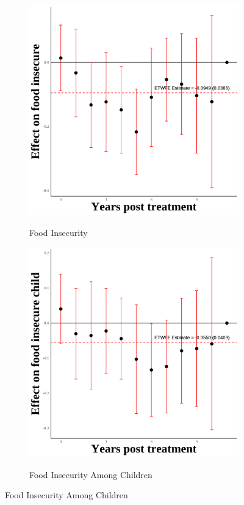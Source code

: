 \documentclass[12pt,english]{article}
\begin{document}
\begin{figure}[H]
  \begin{subfigure}[b]{0.3\textwidth}
    \centering
    \caption{Food Insecurity}
    \includegraphics[width=\linewidth]{figures/plot15-food_insecure_event_study-first.png}
    \label{fig:food-insecure-first}
  \end{subfigure}
  \hfill
  \begin{subfigure}[b]{0.3\textwidth}
    \centering
    \caption{Food Insecurity Among Children}
    \includegraphics[width=\linewidth]{figures/plot16-food_insecure_child_event_study-first.png}
    \label{fig:food-insecure-child-first}
  \end{subfigure}

\end{figure}
\end{document}
